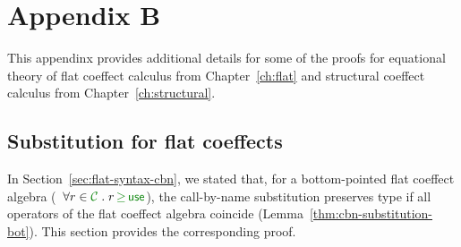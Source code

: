 
\chapter{Appendix B} 
\label{ch:appendix} 

This appendinx provides additional details for some of the proofs for equational theory
of flat coeffect calculus from Chapter~\ref{ch:flat} and structural coeffect calculus
from Chapter~\ref{ch:structural}.



%
%                               

\section{Substitution for flat coeffects}
\label{sec:appendix-flat-cbn}
In Section~\ref{sec:flat-syntax-cbn}, we stated that, for a bottom-pointed flat coeffect
algebra (\ie~$\forall r \in \C \;.\; r \,\cgeq\, \cunit $), the call-by-name substitution 
preserves type if all operators of the flat coeffect algebra coincide (Lemma~\ref{thm:cbn-substitution-bot}).
This section provides the corresponding proof.

